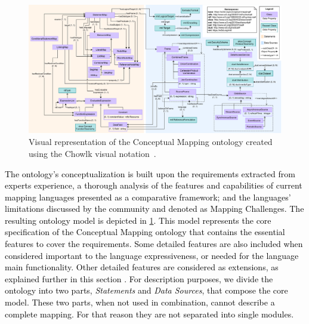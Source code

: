 \begin{figure}
    \centering
    \includegraphics[width=1\linewidth]{figures/chp4-2_cm_diagram.pdf}
    \caption[Conceptual Mapping ontology overview]{Visual representation of the Conceptual Mapping ontology created using the Chowlk visual notation~\citep{feria2022chowlk}.}
    \label{fig:chp4-2_cm_diagram}
\end{figure}

\textcolor{black}{The ontology's conceptualization is built upon the requirements extracted from experts experience, a thorough analysis of the features and capabilities of current mapping languages presented as a comparative framework; and the languages' limitations discussed by the community and denoted as Mapping Challenges. The resulting ontology model is depicted in \cref{fig:chp4-2_cm_diagram}. This model represents the core specification of the Conceptual Mapping ontology that contains the essential features to cover the requirements. Some detailed features are also included when considered important to the language expressiveness, or needed for the language main functionality. Other detailed features are considered as extensions, as explained further in this section . For description purposes, we divide the ontology into two parts, \textit{Statements} and \textit{Data Sources}, that compose the core model. These two parts, when not used in combination, cannot describe a complete mapping. For that reason they are not separated into single modules. } 

